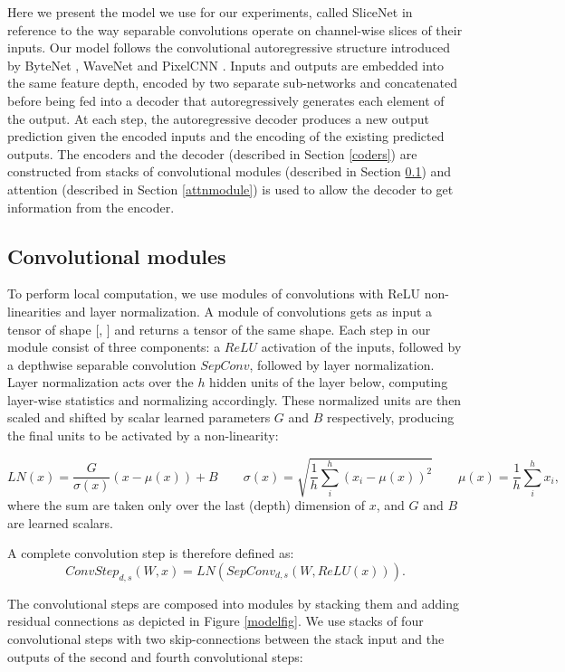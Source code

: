 \documentclass{article}
\newcommand\cs[3]{ConvStep_{#1,#2}(#3)}
\begin{document}
Here we present the model we use for our experiments, called SliceNet in reference to the way separable convolutions operate on channel-wise slices of their inputs. Our model follows the convolutional autoregressive structure introduced by ByteNet \citep{bytenet2016}, WaveNet \citep{wavenet2016} and PixelCNN \citep{pixelcnn2016}. Inputs and outputs are embedded into the same feature depth, encoded by two separate sub-networks and concatenated before being fed into a decoder that autoregressively generates each element of the output. At each step, the autoregressive decoder produces a new output prediction given the encoded inputs and the encoding of the existing predicted outputs. The encoders and the decoder (described in Section \ref{coders}) are constructed from stacks of convolutional modules (described in Section \ref{convmodule}) and attention (described in Section \ref{attnmodule}) is used to allow
the decoder to get information from the encoder.

\subsection{Convolutional modules}\label{convmodule}

To perform local computation, we use modules of convolutions with ReLU non-linearities and layer normalization.
A module of convolutions gets as input a tensor of shape [, ]
and returns a tensor of the same shape. Each step in our module consist of three components: a \(ReLU\) activation of the inputs,
followed by a depthwise separable convolution \(SepConv\), followed by layer normalization. 
Layer normalization \citep{layernorm2016} acts over the \(h\) hidden units of the layer below, computing layer-wise statistics and normalizing accordingly. These normalized units are then scaled and shifted by scalar learned parameters \(G\) and \(B\) respectively, producing the final units to be activated by a non-linearity:

\[ 
    LN(x) = \frac{G}{\sigma(x)}(x-\mu(x)) + B \qquad
    \sigma(x) = \sqrt{\frac{1}{h}\sum^h_i (x_i - \mu(x))^2} \qquad
    \mu(x) = \frac{1}{h}\sum^h_i x_i,
\]
where the sum are taken only over the last (depth) dimension of $x$, and $G$ and $B$ are learned scalars.

A complete convolution step is therefore defined as:
\[ \cs{d}{s}{W, x} = LN(SepConv_{d,s}(W, ReLU(x))). \]

The convolutional steps are composed into modules by stacking them and adding residual connections as depicted in Figure \ref{modelfig}.
We use stacks of four convolutional steps with two skip-connections between the stack input and the outputs of the second and fourth convolutional steps:
\end{document}
